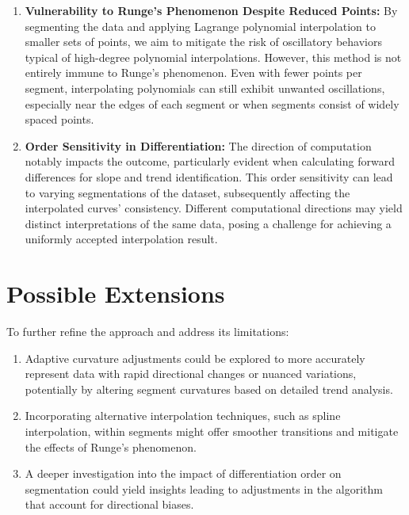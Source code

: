 \documentclass{article}
\begin{document}
\begin{enumerate}
    \item \textbf{Vulnerability to Runge's Phenomenon Despite Reduced Points:} 
    By segmenting the data and applying Lagrange polynomial interpolation to smaller sets of points, we aim to mitigate the risk of oscillatory behaviors typical of high-degree polynomial interpolations. However, this method is not entirely immune to Runge's phenomenon. Even with fewer points per segment, interpolating polynomials can still exhibit unwanted oscillations, especially near the edges of each segment or when segments consist of widely spaced points.
    
    \item \textbf{Order Sensitivity in Differentiation:} 
    The direction of computation notably impacts the outcome, particularly evident when calculating forward differences for slope and trend identification. This order sensitivity can lead to varying segmentations of the dataset, subsequently affecting the interpolated curves' consistency. Different computational directions may yield distinct interpretations of the same data, posing a challenge for achieving a uniformly accepted interpolation result.
\end{enumerate}

\section{Possible Extensions}
To further refine the approach and address its limitations:
\begin{enumerate}
    \item Adaptive curvature adjustments could be explored to more accurately represent data with rapid directional changes or nuanced variations, potentially by altering segment curvatures based on detailed trend analysis.
    \item Incorporating alternative interpolation techniques, such as spline interpolation, within segments might offer smoother transitions and mitigate the effects of Runge's phenomenon.
    \item A deeper investigation into the impact of differentiation order on segmentation could yield insights leading to adjustments in the algorithm that account for directional biases.
\end{enumerate}
\end{document}
